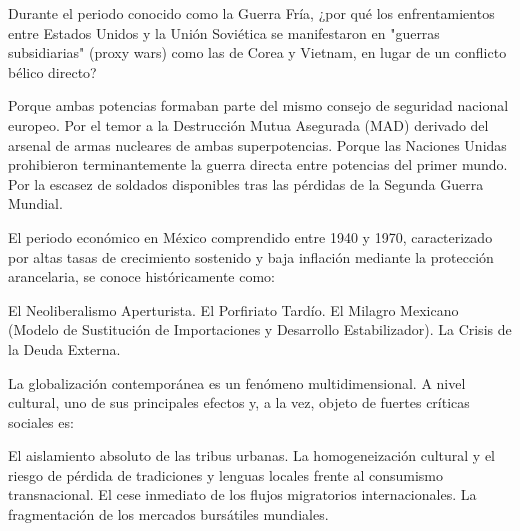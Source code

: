 \documentclass[12pt]{evaluasep}
\begin{document}
\begin{questions}
    \question Durante el periodo conocido como la Guerra Fría, ¿por qué los enfrentamientos entre Estados Unidos y la Unión Soviética se manifestaron en "guerras subsidiarias" (proxy wars) como las de Corea y Vietnam, en lugar de un conflicto bélico directo?
    \begin{choices}
        \choice Porque ambas potencias formaban parte del mismo consejo de seguridad nacional europeo.
        \CorrectChoice Por el temor a la Destrucción Mutua Asegurada (MAD) derivado del arsenal de armas nucleares de ambas superpotencias.
        \choice Porque las Naciones Unidas prohibieron terminantemente la guerra directa entre potencias del primer mundo.
        \choice Por la escasez de soldados disponibles tras las pérdidas de la Segunda Guerra Mundial.
    \end{choices}

    \question El periodo económico en México comprendido entre 1940 y 1970, caracterizado por altas tasas de crecimiento sostenido y baja inflación mediante la protección arancelaria, se conoce históricamente como:
    \begin{choices}
        \choice El Neoliberalismo Aperturista.
        \choice El Porfiriato Tardío.
        \CorrectChoice El Milagro Mexicano (Modelo de Sustitución de Importaciones y Desarrollo Estabilizador).
        \choice La Crisis de la Deuda Externa.
    \end{choices}

    \question La globalización contemporánea es un fenómeno multidimensional. A nivel cultural, uno de sus principales efectos y, a la vez, objeto de fuertes críticas sociales es:
    \begin{choices}
        \choice El aislamiento absoluto de las tribus urbanas.
        \CorrectChoice La homogeneización cultural y el riesgo de pérdida de tradiciones y lenguas locales frente al consumismo transnacional.
        \choice El cese inmediato de los flujos migratorios internacionales.
        \choice La fragmentación de los mercados bursátiles mundiales.
    \end{choices}
\end{questions}
\end{document}
